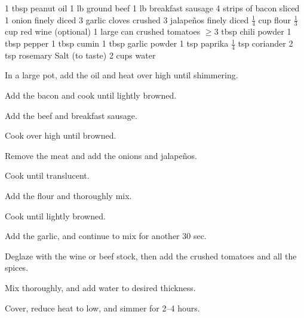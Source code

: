 \dishtype{\main}
\begin{ingreds}
    1 tbsp peanut oil
    1 lb ground beef
    1 lb breakfast sausage
    4 strips of bacon sliced 
    1 onion finely diced
    3 garlic cloves crushed
    3 jalape\~nos finely diced
    $\frac{1}{4}$ cup flour
    $\frac{1}{3}$ cup red wine (optional)
    1 large can crushed tomatoes
    $\geq$3 tbsp chili powder
    1 tbsp pepper
    1 tbsp cumin
    1 tbsp garlic powder
    1 tsp paprika
    $\frac{1}{4}$ tsp coriander
    2 tsp rosemary
    Salt (to taste)
    2 cups water
\end{ingreds}
\begin{method}
    In a large pot, add the oil and heat over high until shimmering.\par
    Add the bacon and cook until lightly browned.\par
    Add the beef and breakfast sausage.\par
    Cook over high until browned.\par
    Remove the meat and add the onions and jalape\~nos.\par
    Cook until translucent.\par
    Add the flour and thoroughly mix.\par
    Cook until lightly browned.\par
    Add the garlic, and continue to mix for another 30 sec.\par
    Deglaze with the wine or beef stock, then add the crushed tomatoes and all the spices.\par
    Mix thoroughly, and add water to desired thickness.\par
    Cover, reduce heat to low, and simmer for 2--4 hours. 
\end{method}